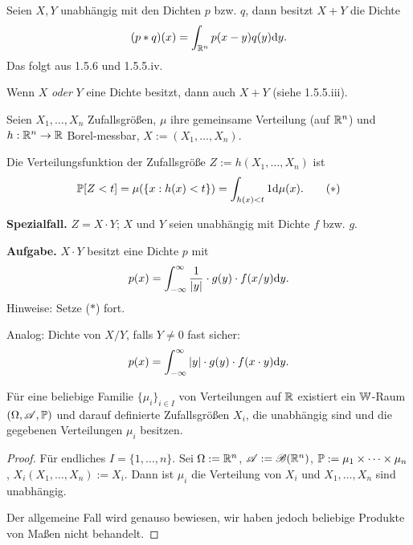 Seien $X,Y$ unabhängig mit den Dichten $p$ bzw. $q$, dann besitzt $X+Y$ die
Dichte
\[ (p \ast q)(x) = \int_{\mathbb{R}^n} p(x-y) q(y) \mathrm{d} y. \]
Das folgt aus 1.5.6 und 1.5.5.iv.

\begin{rmrk*}
  Wenn $X$ \emph{oder} $Y$ eine Dichte besitzt, dann auch $X+Y$ (siehe
  1.5.5.iii).
\end{rmrk*}

\begin{prgp}
  Seien $X_1, \ldots, X_n$ Zufallsgrößen, $\mu$ ihre gemeinsame Verteilung (auf
  $\mathbb{R}^n$) und $h: \mathbb{R}^n \to \mathbb{R}$ Borel-messbar, $X := (X_1, \ldots,
  X_n)$.

  Die Verteilungsfunktion der Zufallsgröße $Z := h(X_1, \ldots, X_n)$ ist
  \[ \mathbb{P}[ Z < t ] = \mu( \{ x : h(x) < t \} ) = \int_{h(x)<t} 1 \mathrm{d} \mu(x).
    \tag{$\ast$} \]

  \textbf{Spezialfall.} $Z = X \cdot Y$; $X$ und $Y$ seien unabhängig mit Dichte
  $f$ bzw. $g$.

  \textbf{Aufgabe.} $X \cdot Y$ besitzt eine Dichte $p$ mit
  \[ p(x) = \int_{-\infty}^\infty \frac{1}{|y|} \cdot g(y) \cdot f(x/y) \mathrm{d} y. \]
  Hinweise: Setze ($\ast$) fort.

  Analog: Dichte von $X/Y$, falls $Y \ne 0$ fast sicher:
  \[ p(x) = \int_{-\infty}^\infty |y| \cdot g(y) \cdot f(x \cdot y) \mathrm{d}
    y. \]
\end{prgp}

\begin{thm}
  Für eine beliebige Familie $\{ \mu_i \}_{i \in I}$ von Verteilungen auf
  $\mathbb{R}$ existiert ein $\mathbb{W}$-Raum $(\Omega, \mathscr{A}, \mathbb{P})$ und darauf definierte
  Zufallsgrößen $X_i$, die unabhängig sind und die gegebenen Verteilungen
  $\mu_i$ besitzen.
\end{thm}

\begin{proof}
  Für endliches $I = \{1, \ldots, n\}$. Sei $\Omega := \mathbb{R}^n$, $\mathscr{A} :=
  \mathscr{B}(\mathbb{R}^n)$, $\mathbb{P} := \mu_1 \times \cdots \times \mu_n$, $X_i(X_1, \ldots,
  X_n) := X_i$. Dann ist $\mu_i$ die Verteilung von $X_i$ und $X_1, \ldots, X_n$
  sind unabhängig.

  Der allgemeine Fall wird genauso bewiesen, wir haben jedoch beliebige Produkte
  von Maßen nicht behandelt.
\end{proof}

